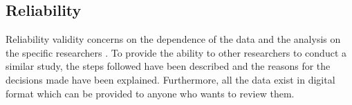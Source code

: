 \subsection{Reliability}
Reliability validity concerns on the dependence of the data and the analysis on the specific researchers \cite{Wohlin}. To provide the ability to other researchers to conduct a similar study, the steps followed have been described and the reasons for the decisions made have been explained. Furthermore, all the data exist in digital format which can be provided to anyone who wants to review them. %














